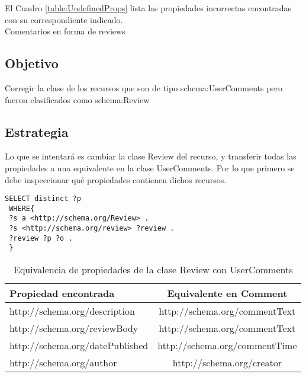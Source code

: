 El Cuadro \ref{table:UndefinedProps} lista las propiedades incorrectas encontradas con su correspondiente indicado.
\\
Comentarios en forma de reviews\\
\subsection*{Objetivo}
Corregir la clase de los recursos que son de tipo schema:UserComments pero fueron clasificados como schema:Review

\subsection*{Estrategia}
Lo que se intentará es cambiar la clase Review del recurso, y transferir todas las propiedades a una equivalente en la clase UserComments.
Por lo que primero se debe inspeccionar qué propiedades contienen dichos recursos.

\begin{lstlisting}[frame=single]
 SELECT distinct ?p
 WHERE{
 ?s a <http://schema.org/Review> .
 ?s <http://schema.org/review> ?review .
 ?review ?p ?o .
 }
\end{lstlisting}

\begin{table}[h]
\begin{tabular}{| l | c |} \hline
Propiedad encontrada & Equivalente en Comment\\\hline
http://schema.org/description & http://schema.org/commentText \\
http://schema.org/reviewBody & http://schema.org/commentText \\
http://schema.org/datePublished & http://schema.org/commentTime \\
http://schema.org/author & http://schema.org/creator \\\hline
\end{tabular}
\caption{Equivalencia de propiedades de la clase Review con UserComments}
\label{table:PropertyEqRevCom}
\end{table}

